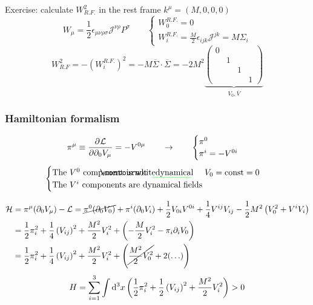 \begin{example}
Exercise: calculate $W^2_{R.F.}$ in the rest frame $k^\mu=(M,0,0,0)$
\[ W_\mu = \frac{1}{2}\epsilon_{\mu\nu\rho\sigma}\mathcal{J}^{\nu\rho}P^\sigma \qquad \begin{cases}
W_0^{R.F.} = 0 \\ W_i^{R.F.} = \frac{M}{2}\epsilon_{ijk}\mathcal{J}^{jk} = M\Sigma_i
\end{cases} \]
\[ W^2_{R.F} = - \left(W_i^{R.F.}\right)^2 = -M \overline{\Sigma}\cdot \overline{\Sigma} = -2M^2 \underbrace{\begin{pmatrix}
0&&&\\&1&&\\&&1&\\&&&1
\end{pmatrix}}_{V_0, \overline{V}} \]
\end{example}

\subsubsection{Hamiltonian formalism}
\[ \pi^\mu \equiv  \frac{\partial{^{}}\mathcal{L}}{\partial{{\partial_0V_\mu}^{}}} = - V^{0\mu} \qquad \to \qquad \begin{cases}
\pi^0 \\ \pi^i = -V^{0i}
\end{cases} \]
\[ \begin{cases}
\text{The $V^0$ component is not \ueig{dynamical}} \quad V_0 = \text{const} = 0\\
\text{The $V^i$ components are dynamical fields}
\end{cases} \]

\begin{align*}
\mathcal{H} &= \pi^\mu(\partial_0V_\mu) - \mathcal{L} = \cancel{\pi^0(\partial_0V_0)} + \pi^i(\partial_0V_i) + \frac{1}{2}V_{0i}V^{0i} + \frac{1}{4}V^{ij}V_{ij} - \frac{1}{2}M^2 \left(V_0^2+V^iV_i \right) \\
&=\frac{1}{2}\pi_i^2 + \frac{1}{4}\left(V_{ij}\right)^2 + \frac{M^2}{2}V_i^2 + \left(- \frac{M}{2}V_i^2 - \pi_i\partial_iV_0\right) \\
&= \frac{1}{2}\pi_i^2 + \frac{1}{4}\left(V_{ij}\right)^2 + \frac{M^2}{2}V_i^2 + \left(\cancel{\frac{M^2}{2}V_0^2} + 2(\ldots)\right) \\
\end{align*}
\[ H = \sum^3_{i=1}\int \operatorname{d \!}{^3x}\left(\frac{1}{2}\pi^2_i + \frac{1}{2}\left(V_{ij}\right)^2 + \frac{M^2}{2}V_i^2\right) >0 \]

